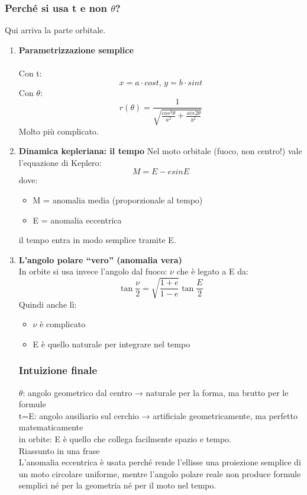\documentclass[a4paper,14pt]{article}
\begin{document}
\subsubsection{Perché si usa t e non \(\theta\)?}
Qui arriva la parte orbitale.\\
\begin{enumerate}
\item \textbf{Parametrizzazione semplice}\\
\\
Con t:\\
\[
x=a \cdot cos⁡t,\,y=b \cdot sin⁡t
\]
Con \(\theta\):\\
\[
r(\theta)=\frac{1}{\sqrt{\frac{cos⁡^2\theta}{a^2}+\frac{sin^⁡2\theta}{b^2}}}
\]​
​
Molto più complicato.\\
\item \textbf{Dinamica kepleriana: il tempo}
Nel moto orbitale (fuoco, non centro!) vale l’equazione di Keplero:
\[
M=E-esin⁡E
\]
dove:
\begin{itemize}
\item M = anomalia media (proporzionale al tempo)\\
\item E = anomalia eccentrica\\
\end{itemize}
il tempo entra in modo semplice tramite E.\\
\item  \textbf{L’angolo polare “vero” (anomalia vera)}\\
In orbite si usa invece l’angolo dal fuoco: \(\nu\)
che è legato a E da:
\[
\tan⁡{\frac{\nu}{2}}=\sqrt{\frac{1+e}{1-e}}\tan{\frac{⁡E}{2}}
​\]
Quindi anche lì:
\begin{itemize}
\item \(\nu\) è complicato
\item E è quello naturale per integrare nel tempo\\
\end{itemize}
\subsubsection{Intuizione finale}
$\theta$: angolo geometrico dal centro → naturale per la forma, ma brutto per le formule\\
t=E: angolo ausiliario sul cerchio → artificiale geometricamente, ma perfetto matematicamente\\
in orbite: E è quello che collega facilmente spazio e tempo.\\
Riassunto in una frase\\
L’anomalia eccentrica è usata perché rende l’ellisse una proiezione semplice di un moto circolare uniforme, mentre l’angolo polare reale non produce formule semplici né per la geometria né per il moto nel tempo.\\
\end{enumerate}
\end{document}
